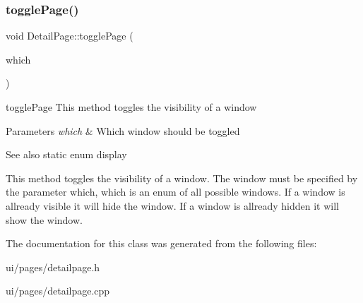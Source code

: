 \subsubsection{\texorpdfstring{toggle\+Page()}{togglePage()}}
{\footnotesize\ttfamily void Detail\+Page\+::toggle\+Page (\begin{DoxyParamCaption}\item[{Detail\+Page\+::display}]{which }\end{DoxyParamCaption})}



toggle\+Page This method toggles the visibility of a window 


\begin{DoxyParams}{Parameters}
{\em which} & Which window should be toggled \\
\hline
\end{DoxyParams}
\begin{DoxySeeAlso}{See also}
static enum display
\end{DoxySeeAlso}
This method toggles the visibility of a window. The window must be specified by the parameter which, which is an enum of all possible windows. If a window is allready visible it will hide the window. If a window is allready hidden it will show the window. 

The documentation for this class was generated from the following files\+:\begin{DoxyCompactItemize}
\item 
ui/pages/detailpage.\+h\item 
ui/pages/detailpage.\+cpp\end{DoxyCompactItemize}
